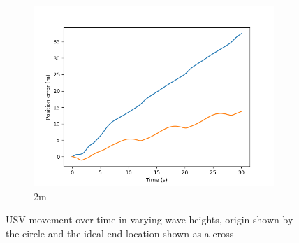 \documentclass[class=article, crop=false]{standalone}
\begin{document}
\begin{figure}
\begin{subfigure}[b]{0.48\textwidth}
        \includegraphics{scenario1/rov-100m/2.0m/usv_pos_error_uncontrolled}
        \caption{2m}
        \label{}
    \end{subfigure}
    \caption{USV movement over time in varying wave heights, origin shown by the circle and the ideal end location shown as a cross}
    \label{}
\end{figure}
\end{document}
